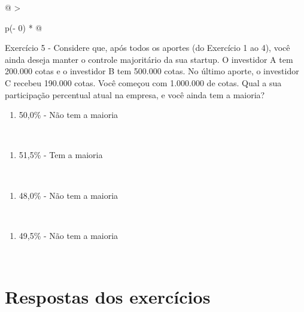 \documentclass[
]{book}
\providecommand{\tightlist}{%
  \setlength{\itemsep}{0pt}\setlength{\parskip}{0pt}}
\begin{document}
\begin{longtable}[]{@{}
  >{\raggedright\arraybackslash}p{(\columnwidth - 0\tabcolsep) * }@{}}
\toprule\noalign{}
\endhead
\bottomrule\noalign{}
\endlastfoot
Exercício 5 - Considere que, após todos os aportes (do Exercício 1 ao 4), você ainda deseja manter o controle majoritário da sua startup. O investidor A tem 200.000 cotas e o investidor B tem 500.000 cotas. No último aporte, o investidor C recebeu 190.000 cotas. Você começou com 1.000.000 de cotas. Qual a sua participação percentual atual na empresa, e você ainda tem a maioria? \\
\begin{minipage}[t]{\linewidth}\raggedright
\begin{enumerate}
\def\labelenumi{\alph{enumi})}
\tightlist
\item
  50,0\% - Não tem a maioria
\end{enumerate}
\end{minipage} \\
\begin{minipage}[t]{\linewidth}\raggedright
\begin{enumerate}
\def\labelenumi{\alph{enumi})}
\setcounter{enumi}{1}
\tightlist
\item
  51,5\% - Tem a maioria
\end{enumerate}
\end{minipage} \\
\begin{minipage}[t]{\linewidth}\raggedright
\begin{enumerate}
\def\labelenumi{\alph{enumi})}
\setcounter{enumi}{2}
\tightlist
\item
  48,0\% - Não tem a maioria
\end{enumerate}
\end{minipage} \\
\begin{minipage}[t]{\linewidth}\raggedright
\begin{enumerate}
\def\labelenumi{\alph{enumi})}
\setcounter{enumi}{3}
\tightlist
\item
  49,5\% - Não tem a maioria
\end{enumerate}
\end{minipage} \\
\end{longtable}

\section{Respostas dos exercícios}\label{respostas-dos-exercuxedcios-1}
\end{document}
